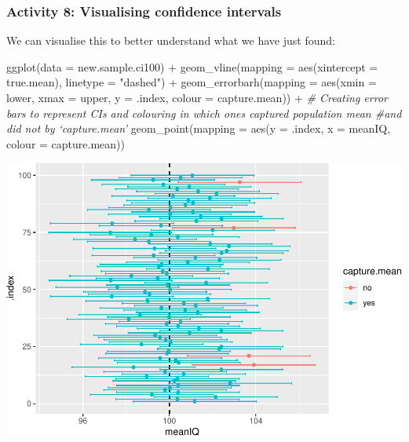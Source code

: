 \documentclass[
]{book}
\newenvironment{Shaded}{\begin{snugshade}}{\end{snugshade}}
\newcommand{\AttributeTok}[1]{\textcolor[rgb]{0.77,0.63,0.00}{#1}}
\newcommand{\CommentTok}[1]{\textcolor[rgb]{0.56,0.35,0.01}{\textit{#1}}}
\newcommand{\FunctionTok}[1]{\textcolor[rgb]{0.00,0.00,0.00}{#1}}
\newcommand{\NormalTok}[1]{#1}
\newcommand{\SpecialCharTok}[1]{\textcolor[rgb]{0.00,0.00,0.00}{#1}}
\newcommand{\StringTok}[1]{\textcolor[rgb]{0.31,0.60,0.02}{#1}}
\begin{document}
\hypertarget{activity-8-visualising-confidence-intervals}{%
\subsubsection{Activity 8: Visualising confidence intervals}\label{activity-8-visualising-confidence-intervals}}

We can visualise this to better understand what we have just found:

\begin{Shaded}
\begin{Highlighting}[]
\FunctionTok{ggplot}\NormalTok{(}\AttributeTok{data =}\NormalTok{ new.sample.ci100) }\SpecialCharTok{+} 
  \FunctionTok{geom\_vline}\NormalTok{(}\AttributeTok{mapping =} \FunctionTok{aes}\NormalTok{(}\AttributeTok{xintercept =}\NormalTok{ true.mean), }\AttributeTok{linetype =} \StringTok{"dashed"}\NormalTok{) }\SpecialCharTok{+}
  \FunctionTok{geom\_errorbarh}\NormalTok{(}\AttributeTok{mapping =} \FunctionTok{aes}\NormalTok{(}\AttributeTok{xmin =}\NormalTok{ lower, }\AttributeTok{xmax =}\NormalTok{ upper, }\AttributeTok{y =}\NormalTok{ .index, }\AttributeTok{colour =}\NormalTok{ capture.mean)) }\SpecialCharTok{+} \CommentTok{\# Creating error bars to represent CIs and colouring in which ones captured population mean \#and did not by ‘capture.mean’}
  \FunctionTok{geom\_point}\NormalTok{(}\AttributeTok{mapping =} \FunctionTok{aes}\NormalTok{(}\AttributeTok{y =}\NormalTok{ .index, }\AttributeTok{x =}\NormalTok{ meanIQ, }\AttributeTok{colour =}\NormalTok{ capture.mean))}
\end{Highlighting}
\end{Shaded}

\includegraphics{05-inferential-statistics_files/figure-latex/unnamed-chunk-15-1.pdf}
\end{document}
